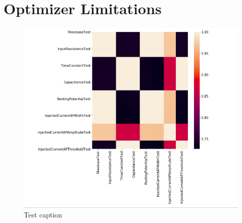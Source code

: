 \section{Optimizer Limitations}


\begin{center}
    \begin{figure}
    
        \includegraphics[width=\linewidth]{figures/correlated_errors.png}
    
    	\caption{Test caption}
    \end{figure}
\end{center}